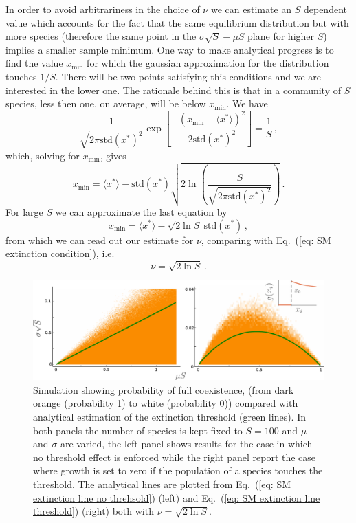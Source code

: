 \documentclass[10pt]{article}
\begin{document}
In order to avoid arbitrariness in the choice of $\nu$
we can estimate an $S$ dependent value which accounts for the fact
that the same equilibrium distribution but with more species
(therefore the same point in the $\sigma\sqrt{S} - \mu S$ plane for higher $S$)
implies a smaller sample minimum.
One way to make analytical progress is to find the value
$x_{\textrm{min}}$ for which the gaussian approximation for the distribution touches
$1/S$. There will be two points satisfying this conditions and we are interested
in the lower one. The rationale behind this is that in a community
of $S$ species, less then one, on average, will be below $x_{\textrm{min}}$.
We have 
\begin{equation}
    \frac{1}{\sqrt{2\pi\textrm{std}(x^*)^2}}
    \exp{\left[-\frac{(x_{\textrm{min}}-\langle x^* \rangle)^2}{2\textrm{std}(x^*)^2}\right]} = \frac{1}{S} \, ,
\end{equation}
which, solving for $x_{\textrm{min}}$, gives
\begin{equation}
    x_{\textrm{min}} = \langle x^* \rangle - \textrm{std}(x^*)\sqrt{2\ln\left(\frac{S}{\sqrt{2\pi\textrm{std}(x^*)^2}}\right)} \, .
\end{equation}
For large $S$ we can approximate the last equation by
\begin{equation}
    x_{\textrm{min}} = \langle x^* \rangle - \sqrt{2\ln S} \ \textrm{std}(x^*) \, ,
\end{equation}
from which we can read out our estimate for $\nu$, comparing with Eq.~(\ref{eq: SM extinction condition}),
i.e.
\begin{equation}
    \nu = \sqrt{2\ln S}\, .
\end{equation}

\begin{figure}[h!]
    \centering
    \includegraphics[width=1\textwidth]{fig/SM-extinction.pdf}
    \caption{Simulation showing probability of full coexistence, (from dark orange (probability 1)
    to white (probability 0)) compared with analytical estimation of the extinction threshold (green lines).
    In both panels the number of species is kept fixed to $S=100$ and $\mu$ and $\sigma$
    are varied, the left panel shows results for the case in which no threshold effect
    is enforced while the right panel report the case where growth is set to zero
    if the population of a species touches the threshold. The analytical lines are plotted
    from Eq.~(\ref{eq: SM extinction line no threhsold}) (left) and Eq.~(\ref{eq: SM extinction line threshold})
    (right) both with $\nu=\sqrt{2\ln S}$.}
    \label{fig: SM extinction threshold}
\end{figure}
\end{document}
